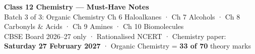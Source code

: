 \documentclass[10pt,a4paper]{extarticle}
\begin{document}
\small

\begin{tcolorbox}[enhanced,colback=navy,colframe=navy,arc=2pt,left=8pt,right=8pt,top=6pt,bottom=6pt]
\color{white}\sffamily
{\LARGE\bfseries Class 12 Chemistry — Must-Have Notes}\\[3pt]
{\large Batch 3 of 3: Organic Chemistry} \hfill {\small Ch 6 Haloalkanes · Ch 7 Alcohols · Ch 8 Carbonyls \& Acids · Ch 9 Amines · Ch 10 Biomolecules}\\[2pt]
{\footnotesize CBSE Board 2026--27 only · Rationalised NCERT · Chemistry paper: \textbf{Saturday 27 February 2027} · Organic Chemistry = \textbf{33 of 70} theory marks}
\end{tcolorbox}
\end{document}
